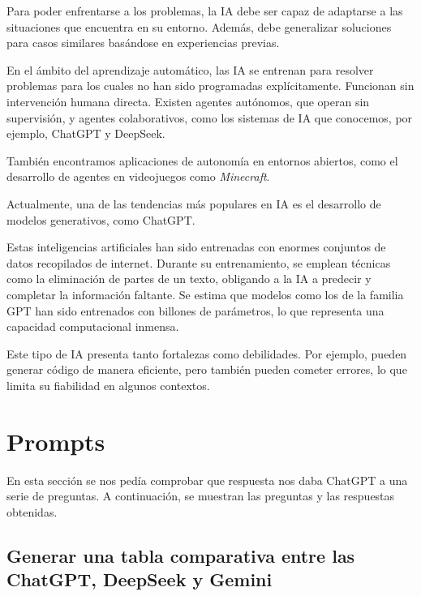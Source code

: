 Para poder enfrentarse a los problemas, la IA debe ser capaz de adaptarse a las situaciones que encuentra en su entorno. Además, debe generalizar soluciones para casos similares basándose en experiencias previas.


En el ámbito del aprendizaje automático, las IA se entrenan para resolver problemas para los cuales no han sido programadas explícitamente. Funcionan sin intervención humana directa. Existen agentes autónomos, que operan sin supervisión, y agentes colaborativos, como los sistemas de IA que conocemos, por ejemplo, ChatGPT y DeepSeek.


También encontramos aplicaciones de autonomía en entornos abiertos, como el desarrollo de agentes en videojuegos como \textit{Minecraft}.


Actualmente, una de las tendencias más populares en IA es el desarrollo de modelos generativos, como ChatGPT. 


Estas inteligencias artificiales han sido entrenadas con enormes conjuntos de datos recopilados de internet. Durante su entrenamiento, se emplean técnicas como la eliminación de partes de un texto, obligando a la IA a predecir y completar la información faltante. Se estima que modelos como los de la familia GPT han sido entrenados con billones de parámetros, lo que representa una capacidad computacional inmensa.


Este tipo de IA presenta tanto fortalezas como debilidades. Por ejemplo, pueden generar código de manera eficiente, pero también pueden cometer errores, lo que limita su fiabilidad en algunos contextos.

\section{Prompts}
En esta sección se nos pedía comprobar que respuesta nos daba ChatGPT a una serie de preguntas. A continuación, se muestran las preguntas y las respuestas obtenidas.

\subsection*{Generar una tabla comparativa entre las ChatGPT, DeepSeek y Gemini}

